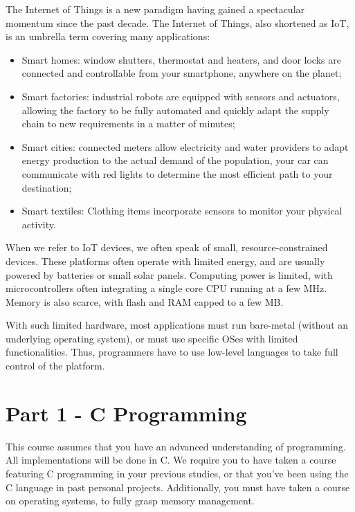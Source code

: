 \documentclass[11pt]{article}
\begin{document}
The Internet of Things is a new paradigm having gained a spectacular momentum since the past decade.
The Internet of Things, also shortened as IoT, is an umbrella term covering many applications:
\begin{itemize}
    \item Smart homes: window shutters, thermostat and heaters, and door locks are connected and controllable from your smartphone, anywhere on the planet;
    \item Smart factories: industrial robots are equipped with sensors and actuators, allowing the factory to be fully automated and quickly adapt the supply chain to new requirements in a matter of minutes;
    \item Smart cities: connected meters allow electricity and water providers to adapt energy production to the actual demand of the population, your car can communicate with red lights to determine the most efficient path to your destination;
    \item Smart textiles: Clothing items incorporate sensors to monitor your physical activity.
\end{itemize}

When we refer to IoT devices, we often speak of small, resource-constrained devices.
These platforms often operate with limited energy, and are usually powered by batteries or small solar panels.
Computing power is limited, with microcontrollers often integrating a single core CPU running at a few MHz.
Memory is also scarce, with flash and RAM capped to a few MB.

With such limited hardware, most applications must run bare-metal (without an underlying operating system), or must use specific OSes with limited functionalities.
Thus, programmers have to use low-level languages to take full control of the platform.

\section*{Part 1 - C Programming}

This course assumes that you have an advanced understanding of programming.
All implementations will be done in C.
We require you to have taken a course featuring C programming in your previous studies, or that you've been using the C language in past personal projects.
Additionally, you must have taken a course on operating systems, to fully grasp memory management.
\end{document}

